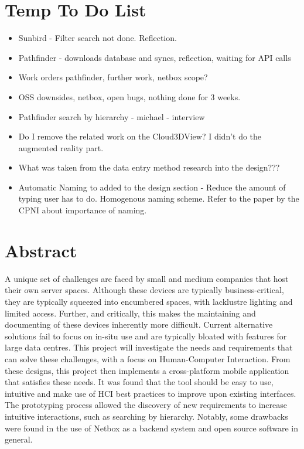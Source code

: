 \documentclass [11pt,a4paper]{article}
\begin{document}
\section{Temp To Do List}
\begin{itemize}
    \item Sunbird - Filter search not done. Reflection. 
    \item Pathfinder - downloads database and syncs, reflection, waiting for API calls
    \item Work orders pathfinder, further work, netbox scope?
    \item OSS downsides, netbox, open bugs, nothing done for 3 weeks. 
    \item Pathfinder search by hierarchy - michael - interview
    \item Do I remove the related work on the Cloud3DView? I didn't do the augmented reality part.
    \item What was taken from the data entry method research into the design???
    \item Automatic Naming to added to the design section - Reduce the amount of typing user has to do. Homogenous naming scheme. Refer to the paper by the CPNI about importance of naming.
\end{itemize}
\pagebreak

\section*{Abstract}
    \noindent
    A unique set of challenges are faced by small and medium companies that host their own server spaces. Although these devices are typically business-critical, they are typically squeezed into encumbered spaces, with lacklustre lighting and limited access. Further, and critically, this makes the maintaining and documenting of these devices inherently more difficult. Current alternative solutions fail to focus on in-situ use and are typically bloated with features for large data centres. This project will investigate the needs and requirements that can solve these challenges, with a focus on Human-Computer Interaction. From these designs, this project then implements a cross-platform mobile application that satisfies these needs. It was found that the tool should be easy to use, intuitive and make use of HCI best practices to improve upon existing interfaces. The prototyping process allowed the discovery of new requirements to increase intuitive interactions, such as searching by hierarchy. Notably, some drawbacks were found in the use of Netbox as a backend system and open source software in general.  
\end{document}
